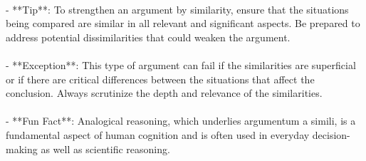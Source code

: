 \documentclass[a4paper,12pt,single,pdftex]{scrbook}
\begin{document}
    
      
    \\

    
      - **Tip**: To strengthen an argument by similarity, ensure that the situations being compared are similar in all relevant and significant aspects. Be prepared to address potential dissimilarities that could weaken the argument.
    \\

    
      
    \\

    
      - **Exception**: This type of argument can fail if the similarities are superficial or if there are critical differences between the situations that affect the conclusion. Always scrutinize the depth and relevance of the similarities.
    \\

    
      
    \\

    
      - **Fun Fact**: Analogical reasoning, which underlies argumentum a simili, is a fundamental aspect of human cognition and is often used in everyday decision-making as well as scientific reasoning.
    \\
\end{document}
